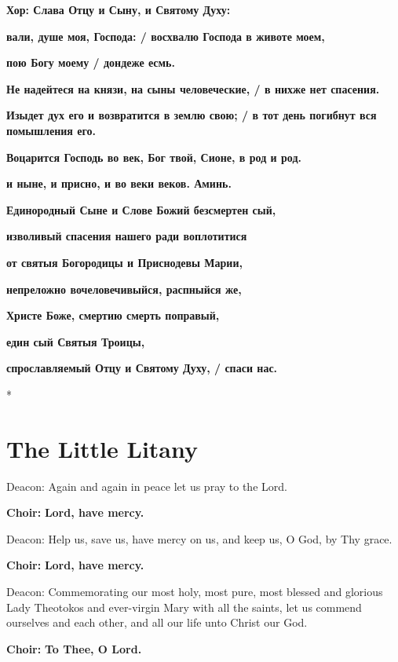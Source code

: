 \documentclass[12pt,a4paper,titlepage]{report}
\begin{document}
\begin{paracol}[1]{2}
  \textbf{Хор: Слава Отцу и Сыну, и Святому Духу:}
  \medskip

  \textbf{вали, душе моя, Господа: / восхвалю Господа в животе моем,}

  \textbf{пою Богу моему / дондеже есмь.}

  \textbf{Не надейтеся на князи, на сыны человеческие, / в нихже нет спасения.}

  \textbf{Изыдет дух его и возвратится в землю свою; / в тот день погибнут вся помышления его.}

  \textbf{Воцарится Господь во век, Бог твой, Сионе, в род и род.}

  \medskip
  \textbf{и ныне, и присно, и во веки веков. Аминь.}
  \medskip

  \textbf{Единородный Сыне и Слове Божий безсмертен сый,}

  \textbf{изволивый спасения нашего ради воплотитися}

  \textbf{от святыя Богородицы и Приснодевы Марии,}

  \textbf{непреложно вочеловечивыйся, распныйся же,}

  \textbf{Христе Боже, смертию смерть поправый,}

  \textbf{един сый Святыя Троицы,}

  \textbf{спрославляемый Отцу и Святому Духу, / спаси нас.}

  \switchcolumn[0]*

  \section*{The Little Litany}

  Deacon: Again and again in peace let us pray to the Lord.

  \textbf{Choir:} \textbf{Lord, have mercy.}

  Deacon: Help us, save us, have mercy on us, and keep us, O God, by Thy grace.

  \textbf{Choir:} \textbf{Lord, have mercy.}

  Deacon: Commemorating our most holy, most pure, most blessed and glorious Lady Theotokos and ever-virgin Mary with all the saints, let us commend ourselves and each other, and all our life unto Christ our God.

  \textbf{Choir:} \textbf{To Thee, O Lord.}


\end{paracol}
\end{document}
